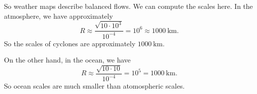 \documentclass[a4paper]{article}
\begin{document}
So weather maps describe balanced flows. We can compute the scales here. In the atmosphere, we have approximately
\[
  R \approx \frac{\sqrt{10 \cdot 10^3}}{10^{-4}} = 10^6 \approx \SI{1000}{\kilo\meter}.
\]
So the scales of cyclones are approximately $\SI{1000}{\kilo\meter}$.

On the other hand, in the ocean, we have
\[
  R \approx \frac{\sqrt{10 \cdot 10}}{10^{-4}} = 10^5 = \SI{1000}{\kilo\meter}.
\]
So ocean scales are much smaller than atomospheric scales.
\end{document}
